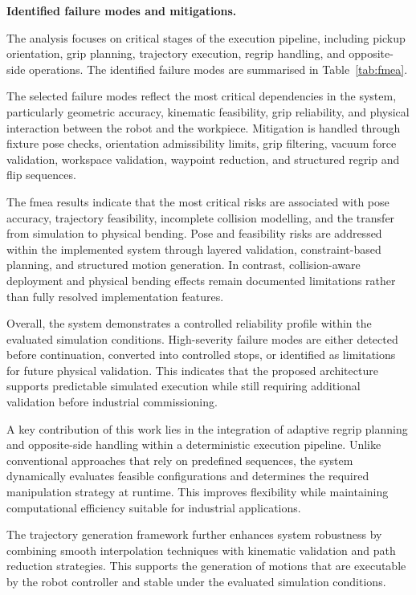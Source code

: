 \label{sec:identification-failure-modes}
\noindent\textbf{Identified failure modes and mitigations.}

The analysis focuses on critical stages of the execution pipeline, including pickup orientation, grip planning, trajectory execution, regrip handling, and opposite-side operations. The identified failure modes are summarised in Table~\ref{tab:fmea}.



The selected failure modes reflect the most critical dependencies in the system, particularly geometric accuracy, kinematic feasibility, grip reliability, and physical interaction between the robot and the workpiece. Mitigation is handled through fixture pose checks, orientation admissibility limits, grip filtering, vacuum force validation, workspace validation, waypoint reduction, and structured regrip and flip sequences.

The \acs{fmea} results indicate that the most critical risks are associated with pose accuracy, trajectory feasibility, incomplete collision modelling, and the transfer from simulation to physical bending. Pose and feasibility risks are addressed within the implemented system through layered validation, constraint-based planning, and structured motion generation. In contrast, collision-aware deployment and physical bending effects remain documented limitations rather than fully resolved implementation features.

Overall, the system demonstrates a controlled reliability profile within the evaluated simulation conditions. High-severity failure modes are either detected before continuation, converted into controlled stops, or identified as limitations for future physical validation. This indicates that the proposed architecture supports predictable simulated execution while still requiring additional validation before industrial commissioning.

A key contribution of this work lies in the integration of adaptive regrip planning and opposite-side handling within a deterministic execution pipeline. Unlike conventional approaches that rely on predefined sequences, the system dynamically evaluates feasible configurations and determines the required manipulation strategy at runtime. This improves flexibility while maintaining computational efficiency suitable for industrial applications.

The trajectory generation framework further enhances system robustness by combining smooth interpolation techniques with kinematic validation and path reduction strategies. This supports the generation of motions that are executable by the robot controller and stable under the evaluated simulation conditions.

